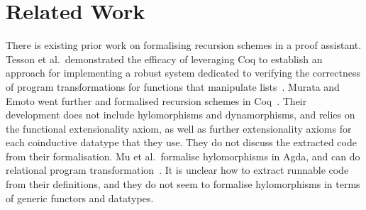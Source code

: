 \documentclass[a4paper,UKenglish,cleveref, autoref, thm-restate]{lipics-v2021}
\begin{document}
\section{Related Work}
\label{sec:related-work}

%


There is existing prior work on formalising recursion schemes in a proof
assistant.  Tesson et al.\ demonstrated the efficacy of leveraging Coq to
establish an approach for implementing a robust system dedicated to verifying
the correctness of program transformations for functions that manipulate
lists~\cite{10.1007/978-3-642-17796-5_10}. Murata and Emoto went further and
formalised recursion schemes in Coq~\cite{MurataE19}. Their development does not
include hylomorphisms and dynamorphisms, and relies on the functional
extensionality axiom, as well as further extensionality axioms for each
coinductive datatype that they use. They do not discuss the extracted code from
their formalisation.  Mu et al.\ formalise hylomorphisms in Agda, and can do
relational program transformation~\cite{DBLP:journals/jfp/MuKJ09}. It is unclear
how to extract runnable code from their definitions, and they do not seem to
formalise hylomorphisms in terms of generic functors and datatypes.
\end{document}
